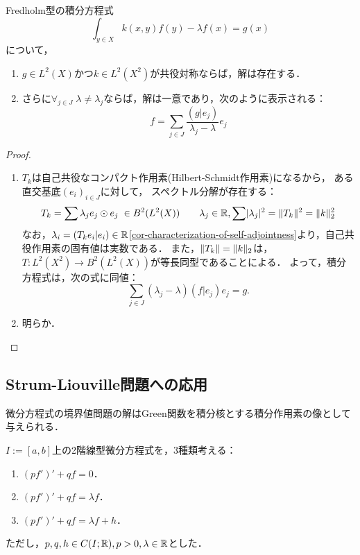 \documentclass[uplatex,dvipdfmx]{jsreport}
\begin{document}
\begin{proposition}
    Fredholm型の積分方程式
    \[\int_{y\in X}k(x,y)f(y)-\lambda f(x)=g(x)\]
    について，
    \begin{enumerate}
        \item $g\in L^2(X)$かつ$k\in L^2(X^2)$が共役対称ならば，解は存在する．
        \item さらに$\forall_{j\in J}\;\lambda\ne\lambda_j$ならば，解は一意であり，次のように表示される：
        \[f=\sum_{j\in J}\frac{(g|e_j)}{\lambda_j-\lambda}e_j\]
    \end{enumerate}
\end{proposition}
\begin{proof}\mbox{}
    \begin{enumerate}
        \item $T_k$は自己共役なコンパクト作用素(Hilbert-Schmidt作用素)になるから，
        ある直交基底$(e_i)_{i\in J}$に対して，
        スペクトル分解が存在する：
        \[T_k=\sum\lambda_je_j\odot e_j\;\in B^2(L^2(X))\qquad\lambda_j\in\mathbb{R},\sum\lvert\lambda_j\rvert^2=\|T_k\|^2=\|k\|^2_2\]
        なお，$\lambda_i=(T_ke_i|e_i)\in\mathbb{R}$\ref{cor-characterization-of-self-adjointness}より，自己共役作用素の固有値は実数である．
        また，$\|T_k\|=\|k\|_2$は，$T:L^2(X^2)\to B^2(L^2(X))$が等長同型であることによる．
        よって，積分方程式は，次の式に同値：
        \[\sum_{j\in J}(\lambda_j-\lambda)(f|e_j)e_j=g.\]
        \item 明らか．
    \end{enumerate}
\end{proof}

\subsection{Strum-Liouville問題への応用}

\begin{tcolorbox}[colframe=ForestGreen, colback=ForestGreen!10!white,breakable,colbacktitle=ForestGreen!40!white,coltitle=black,fonttitle=\bfseries\sffamily,
title=]
    微分方程式の境界値問題の解はGreen関数を積分核とする積分作用素の像として与えられる．
\end{tcolorbox}

\begin{problem}
    $I:=[a,b]$上の2階線型微分方程式を，3種類考える：
    \begin{enumerate}
        \item $(pf')'+qf=0$．
        \item $(pf')'+qf=\lambda f$．
        \item $(pf')'+qf=\lambda f+h$．
    \end{enumerate}
    ただし，$p,q,h\in C(I;\mathbb{R}),p>0,\lambda\in\mathbb{R}$とした．
\end{problem}
\end{document}
